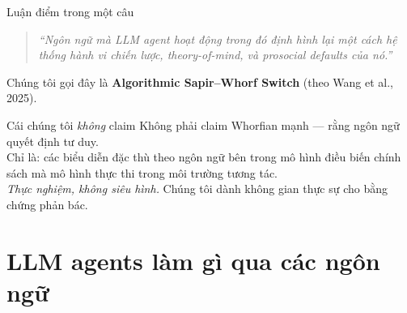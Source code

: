 \documentclass[11pt,aspectratio=169]{beamer}
\begin{document}
\begin{frame}{Luận điểm trong một câu}
    \vspace{0.2cm}
    \large
    \begin{quote}
        \itshape ``Ngôn ngữ mà LLM agent hoạt động trong đó định hình lại một cách hệ thống hành vi chiến lược, theory-of-mind, và prosocial defaults của nó.''
    \end{quote}
    \vspace{0.3cm}
    \normalsize
    Chúng tôi gọi đây là \textbf{Algorithmic Sapir--Whorf Switch} (theo Wang et al., 2025).
    \vspace{0.4cm}
    \begin{block}{Cái chúng tôi \emph{không} claim}
        Không phải claim Whorfian mạnh — rằng ngôn ngữ quyết định tư duy.\\
        Chỉ là: các biểu diễn đặc thù theo ngôn ngữ bên trong mô hình điều biến chính sách mà mô hình thực thi trong môi trường tương tác.\\
        \emph{Thực nghiệm, không siêu hình.} Chúng tôi dành không gian thực sự cho bằng chứng phản bác.
    \end{block}
\end{frame}

\section{LLM agents làm gì qua các ngôn ngữ}
\end{document}

